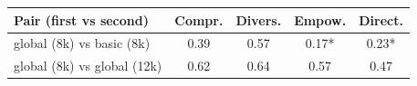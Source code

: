 \begin{tabular}{lcccc}
\toprule
Pair (first vs second) & Compr. & Divers. & Empow. & Direct. \\
\midrule
global (8k) vs basic (8k) & 0.39 & 0.57 & 0.17* & 0.23* \\
global (8k) vs global (12k) & 0.62 & 0.64 & 0.57 & 0.47 \\
\bottomrule
\end{tabular}
